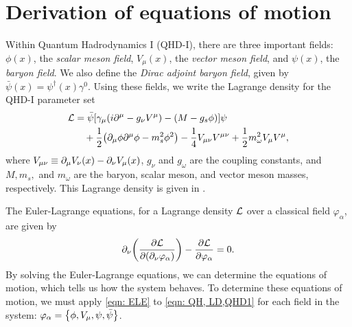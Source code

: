 \section{Derivation of equations of motion}\label{sec: qhd1, eom derivation}


Within Quantum Hadrodynamics I (QHD-I), there are three important fields: $\phi(x)$, the \textit{scalar meson field}, $V_\mu(x)$, the \textit{vector meson field}, and $\psi(x)$, the \textit{baryon field}. We also define the \textit{Dirac adjoint baryon field}, given by $\bar\psi(x) = \psi^\dagger(x) \gamma^0$. Using these fields, we write the Lagrange density for the QHD-I parameter set
\begin{align} \label{eqn: QH, LD,QHD1}
    \Lag & = \bar{\psi} \bqty{\gamma_\mu(i\p^\mu -g_\nu V^\mu) - (M-g_s\phi)} \psi \nonumber\\
    & \quad + \frac{1}{2} \pqty{\p_\mu \phi \p^\mu \phi - m_s^2 \phi^2} - \frac{1}{4} V_{\mu\nu}V^{\mu\nu} + \frac{1}{2} m_\omega^2 V_\mu V^\mu,
\end{align}
where $V_{\mu\nu}\equiv\partial_\mu V_\nu (x) - \partial_\nu V_\mu(x)$, $g_\nu$ and $g_\omega$ are the coupling constants, and $M, m_s,$ and $m_\omega$ are the baryon, scalar meson, and vector meson masses, respectively. This Lagrange density is given in \autocite[p. 56]{diener_2008}.

The Euler-Lagrange equations, for a Lagrange density $\mathcal{L}$ over a classical field $\varphi_\alpha$, are given by
\begin{align}\label{eqn: ELE}
    \partial_\nu\qty(\pdv{\mathcal{L}}{(\partial_\nu \varphi_\alpha)}) - \pdv{\mathcal{L}}{\varphi_\alpha} = 0.
\end{align}
By solving the Euler-Lagrange equations, we can determine the equations of motion, which tells us how the system behaves. To determine these equations of motion, we must apply \eqref{eqn: ELE} to \eqref{eqn: QH, LD,QHD1} for each field in the system: $\varphi_\alpha = \Bqty{\phi, V_\mu, \psi, \bar\psi}$.

